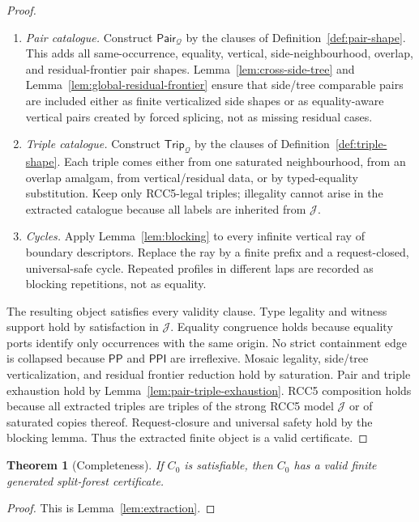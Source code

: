 \documentclass[11pt]{article}
\newtheorem{theorem}{Theorem}[section]
\newcommand{\PP}{\mathsf{PP}}
\newcommand{\PPI}{\mathsf{PPI}}
\newcommand{\J}{\mathcal J}
\newcommand{\Q}{\mathcal Q}
\newcommand{\Pair}{\mathsf{Pair}}
\newcommand{\Trip}{\mathsf{Trip}}
\begin{document}
\begin{proof}
\begin{enumerate}[label=(E\arabic*)]
\item \emph{Pair catalogue.}  Construct $\Pair_\Q$ by the clauses of Definition~\ref{def:pair-shape}.  This adds all same-occurrence, equality, vertical, side-neighbourhood, overlap, and residual-frontier pair shapes.  Lemma~\ref{lem:cross-side-tree} and Lemma~\ref{lem:global-residual-frontier} ensure that side/tree comparable pairs are included either as finite verticalized side shapes or as equality-aware vertical pairs created by forced splicing, not as missing residual cases.
\item \emph{Triple catalogue.}  Construct $\Trip_\Q$ by the clauses of Definition~\ref{def:triple-shape}.  Each triple comes either from one saturated neighbourhood, from an overlap amalgam, from vertical/residual data, or by typed-equality substitution.  Keep only RCC5-legal triples; illegality cannot arise in the extracted catalogue because all labels are inherited from $\J$.
\item \emph{Cycles.}  Apply Lemma~\ref{lem:blocking} to every infinite vertical ray of boundary descriptors.  Replace the ray by a finite prefix and a request-closed, universal-safe cycle.  Repeated profiles in different laps are recorded as blocking repetitions, not as equality.
\end{enumerate}

The resulting object satisfies every validity clause.  Type legality and witness support hold by satisfaction in $\J$.  Equality congruence holds because equality ports identify only occurrences with the same origin.  No strict containment edge is collapsed because $\PP$ and $\PPI$ are irreflexive.  Mosaic legality, side/tree verticalization, and residual frontier reduction hold by saturation.  Pair and triple exhaustion hold by Lemma~\ref{lem:pair-triple-exhaustion}.  RCC5 composition holds because all extracted triples are triples of the strong RCC5 model $\J$ or of saturated copies thereof.  Request-closure and universal safety hold by the blocking lemma.  Thus the extracted finite object is a valid certificate.
\end{proof}


\begin{theorem}[Completeness]\label{thm:completeness}
If $C_0$ is satisfiable, then $C_0$ has a valid finite generated split-forest certificate.
\end{theorem}

\begin{proof}
This is Lemma~\ref{lem:extraction}.
\end{proof}
\end{document}
